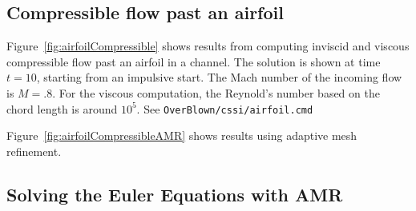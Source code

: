 \documentclass{article}
\begin{document}

% 
% 



\clearpage
\subsection{Compressible flow past an airfoil}


Figure~\ref{fig:airfoilCompressible} shows results from computing inviscid and viscous compressible 
flow past an airfoil in a channel. The solution is shown at time $t=10$,  starting
from an impulsive start. The Mach number of the incoming flow is $M=.8$. 
For the viscous computation, the Reynold's number based on the chord length
is around $10^5$. See {\tt OverBlown/\-cssi/\-airfoil.cmd}

Figure~\ref{fig:airfoilCompressibleAMR} shows results using adaptive mesh refinement.





\clearpage
\subsection{Solving the Euler Equations with AMR}
\end{document}
